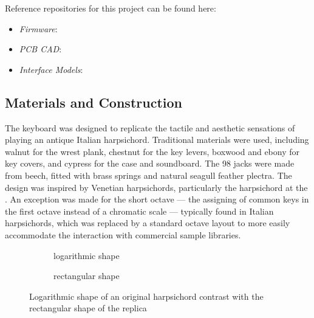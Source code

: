 \begin{anonsuppress}
Reference repositories for this project can be found here:

    \begin{itemize}
        \item 
        \emph{Firmware}: 
        \item 
        \emph{PCB CAD}: 
        \item 
        \emph{Interface Models}: 
    \end{itemize}
\end{anonsuppress}

\subsection{Materials and Construction}

The keyboard was designed to replicate the tactile and aesthetic sensations of playing an antique Italian harpsichord. Traditional materials were used, including walnut for the wrest plank, chestnut for the key levers, boxwood and ebony for key covers, and cypress for the case and soundboard. The 98 jacks were made from beech, fitted with brass springs and natural seagull feather plectra. The design was inspired by Venetian harpsichords, particularly the  harpsichord at the . An exception was made for the short octave --- the assigning of common keys in the first octave instead of a chromatic scale --- typically found in Italian harpsichords, which was replaced by a standard octave layout to more easily accommodate the interaction with commercial sample libraries. 

\begin{figure}[!b]
    \centering
     \begin{subfigure}[h]{0.4\linewidth}
        \centering
                    
        \caption{logarithmic shape}    
        \label{fig:log-harp}
    \end{subfigure}

    
    \begin{subfigure}[h]{0.4\linewidth}
        \centering
                
        \caption{rectangular shape}
        \label{fig:rect-harp}
    \end{subfigure}
    \caption{Logarithmic shape of an original  harpsichord contrast with the rectangular shape of the replica}    
    \Description{}
    \label{fig:log-harp-comp}
\end{figure}

